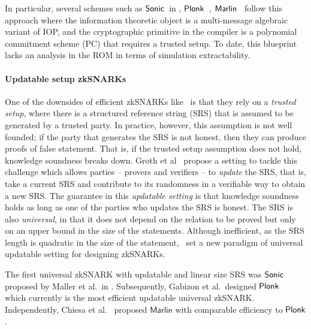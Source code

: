 %

In particular, several schemes such as
${\textnormal{\textsf{Sonic}}}$~in \cite{CCS:MBKM19}, $\textnormal{\textsf{Plonk}}$~\cite{EPRINT:GabWilCio19}, ${\textnormal{\textsf{Marlin}}}$~\cite{EC:CHMMVW20} 
follow this approach where the information theoretic object is a multi-message algebraic variant of IOP, and the cryptographic primitive in the compiler is a polynomial commitment scheme (PC) that requires a trusted setup. To date, this blueprint lacks an analysis in the ROM in terms of simulation extractability.


\paragraph{Updatable setup zkSNARKs}
One of the downsides of efficient zkSNARKs like~\cite{AC:Groth10a,TCC:Lipmaa12,EC:GGPR13,SP:PHGR13,AC:Lipmaa13,AC:DFGK14,EC:Groth16} is that they rely on a \textit{trusted setup}, where there is a structured reference string (SRS) that is assumed to be generated by a trusted party. In practice, however, this assumption is not well founded; if the party that generates the SRS is not honest, then they can produce proofs of false statement. That is, if the trusted setup assumption does not hold, knowledge soundness breaks down.
Groth et al~\cite{C:GKMMM18} propose a setting to tackle this challenge which allows parties -- provers and verifiers -- to \emph{update} the SRS, that is, take a current SRS and contribute to its randomness in a verifiable way to obtain a new SRS. The guarantee in this \textit{updatable setting} is that knowledge soundness holds as long as one of the parties who updates the SRS is honest. The SRS is also \emph{universal}, in that it does not depend on the relation to be proved but only on an upper bound in the size of the statements.
Although inefficient, as the SRS length is quadratic in the size of the statement,~\cite{C:GKMMM18} set a new
paradigm of universal updatable setting for designing zkSNARKs.

The first universal zkSNARK with updatable and linear size SRS was
${\textnormal{\textsf{Sonic}}}$ proposed by Maller et al.~in \cite{CCS:MBKM19}. Subsequently, Gabizon et
al.~designed $\textnormal{\textsf{Plonk}}$~\cite{EPRINT:GabWilCio19} which currently is the
most efficient updatable universal zkSNARK. Independently, Chiesa et
al.~\cite{EC:CHMMVW20} proposed $\textsf{Marlin}$ with comparable efficiency to
$\textnormal{\textsf{Plonk}}$.

